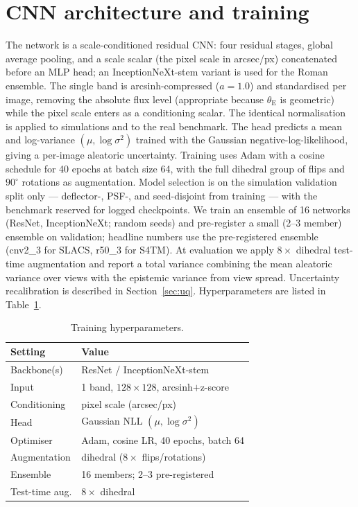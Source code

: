 \documentclass[fleqn,usenatbib]{mnras}
\newcommand{\thetaE}{\theta_{\mathrm{E}}}
\begin{document}
\section{CNN architecture and training}
\label{sec:cnn}
The network is a scale-conditioned residual CNN: four residual stages, global
average pooling, and a scale scalar (the pixel scale in arcsec/px) concatenated
before an MLP head; an InceptionNeXt-stem variant is used for the Roman
ensemble. The single band is arcsinh-compressed ($a=1.0$) and standardised per
image, removing the absolute flux level (appropriate because $\thetaE$ is
geometric) while the pixel scale enters as a conditioning scalar. The identical
normalisation is applied to simulations and to the real benchmark. The head
predicts a mean and log-variance $(\mu,\log\sigma^2)$ trained with the Gaussian
negative-log-likelihood, giving a per-image aleatoric uncertainty. Training uses
Adam with a cosine schedule for 40 epochs at batch size 64, with the full
dihedral group of flips and $90^\circ$ rotations as augmentation. Model
selection is on the simulation validation split only --- deflector-, PSF-, and
seed-disjoint from training --- with the benchmark reserved for logged
checkpoints. We train an ensemble of 16 networks (ResNet, InceptionNeXt; random
seeds) and pre-register a small (2--3 member) ensemble on validation; headline
numbers use the pre-registered ensemble (cnv2\_3 for SLACS, r50\_3 for S4TM).
At evaluation we apply $8\times$ dihedral test-time augmentation and report a
total variance combining the mean aleatoric variance over views with the
epistemic variance from view spread. Uncertainty recalibration is described in
Section~\ref{sec:uq}. Hyperparameters are listed in Table~\ref{tab:hparams}.

\begin{table}
\centering
\caption{Training hyperparameters.}
\label{tab:hparams}
\begin{tabular}{ll}
\toprule
Setting & Value \\
\midrule
Backbone(s)        & ResNet / InceptionNeXt-stem \\
Input              & 1 band, $128\times128$, arcsinh$+$z-score \\
Conditioning       & pixel scale (arcsec/px) \\
Head               & Gaussian NLL $(\mu,\log\sigma^2)$ \\
Optimiser          & Adam, cosine LR, 40 epochs, batch 64 \\
Augmentation       & dihedral ($8\times$ flips/rotations) \\
Ensemble           & 16 members; 2--3 pre-registered \\
Test-time aug.     & $8\times$ dihedral \\
\bottomrule
\end{tabular}
\end{table}
\end{document}
